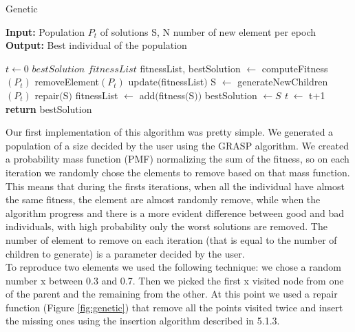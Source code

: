 \begin{algorithm}
	\caption{Genetic}\label{Genetic method}
	\hspace*{\algorithmicindent} \textbf{Input:} Population $P_t$ of solutions S, N number of new element per epoch \\
	\hspace*{\algorithmicindent} \textbf{Output:} Best individual of the population
    \begin{algorithmic}[1]
    		\State $\textit{t} \leftarrow 0$
    		\State $\textit{bestSolution}$
    		\State $\textit{fitnessList}$
    		\State fitnessList, bestSolution $\leftarrow$ computeFitness$(P_t)$ 
    				\State removeElement$(P_t)$
    				\State update$($fitnessList$)$
    			\EndFor
    				\State S $\leftarrow$ generateNewChildren$(P_t)$
    				\State repair$($S$)$
    				\State fitnessList $\leftarrow$ add$($fitness$($S$))$
    					\State bestSolution $\leftarrow S$
    				\EndIf
    			\EndFor
    			\State \textit{t} $\leftarrow$ t+1
    		\EndWhile
    		\State \textbf{return} bestSolution 
    \end{algorithmic}
\end{algorithm}


\noindent Our first implementation of this algorithm was pretty simple. We generated a population of a size decided by the user using the GRASP algorithm. We created a probability mass function (PMF) normalizing the sum of the fitness, so on each iteration we randomly chose the elements to remove based on that mass function. This means that during the firsts iterations, when all the individual have almost the same fitness, the element are almost randomly remove, while when the algorithm progress and there is a more evident difference between good and bad individuals, with high probability only the worst solutions are removed. The number of element to remove on each iteration (that is equal to the number of children to generate) is a parameter decided by the user. \\
To reproduce two elements we used the following technique: we chose a random number x between 0.3 and 0.7. Then we picked the first x visited node from one of the parent and the remaining from the other. At this point we used a repair function (Figure \ref{fig:genetic}) that remove all the points visited twice and insert the missing ones using the insertion algorithm described in 5.1.3. 

